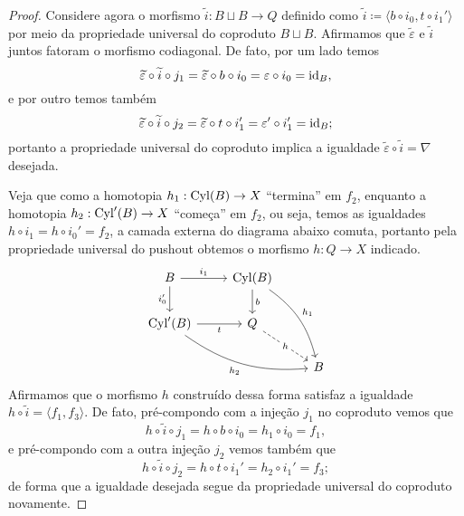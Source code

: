 \begin{proof}
  Considere agora o morfismo $\widetilde{i}: B \sqcup B \to Q$ definido como $\widetilde{i} \coloneqq \langle b \circ i_{0}, t \circ i_{1}' \rangle$ por meio da propriedade universal do coproduto $B \sqcup B$.
  Afirmamos que $\widetilde{\varepsilon}$ e $\widetilde{i}$ juntos fatoram o morfismo codiagonal.
  De fato, por um lado temos
  \begin{displaymath}
    \widetilde{\varepsilon} \circ \widetilde{i} \circ j_{1}
    = \widetilde{\varepsilon} \circ b \circ i_{0}
    = \varepsilon \circ i_{0}
    = \mathrm{id}_{B},
  \end{displaymath}
  e por outro temos também
  \begin{displaymath}
    \widetilde{\varepsilon} \circ \widetilde{i} \circ j_{2}
    = \widetilde{\varepsilon} \circ t \circ i_{1}'
    = \varepsilon' \circ i_{1}'
    = \mathrm{id}_{B};
  \end{displaymath}
  portanto a propriedade universal do coproduto implica a igualdade $\widetilde{\varepsilon} \circ \widetilde{i} = \nabla$ desejada.

  Veja que como a homotopia $h_{1}: \mathrm{Cyl}(B) \to X$ ``termina'' em $f_{2}$, enquanto a homotopia $h_{2}: \mathrm{Cyl}'(B) \to X$ ``começa'' em $f_{2}$, ou seja, temos as igualdades $h \circ i_{1} = h \circ i_{0}' = f_{2}$, a camada externa do diagrama abaixo comuta, portanto pela propriedade universal do pushout obtemos o morfismo $h: Q \to X$ indicado.
  \begin{displaymath}
     \begin{tikzcd}
      B
      \arrow[r, "i_{1}"]
      \arrow[d, "i_{0}'" swap]
      & \Cyl(B)
      \arrow[d, "b"]
      \arrow[rdd, bend left=20, "h_{1}"]
      \\ \Cyl'(B)
      \arrow[r, "t" swap]
      \arrow[rrd, bend right=20, "h_{2}" swap]
      & Q
      \arrow[rd, dashed, "h" description]
      \\ & & B
    \end{tikzcd}
  \end{displaymath}
  Afirmamos que o morfismo $h$ construído dessa forma satisfaz a igualdade $h \circ \widetilde{i} = \langle f_{1},f_{3} \rangle$.
  De fato, pré-compondo com a injeção $j_{1}$ no coproduto vemos que
  \begin{displaymath}
    h \circ \widetilde{i} \circ j_{1} = h \circ b \circ i_{0} = h_{1} \circ i_{0} = f_{1},
  \end{displaymath}
  e pré-compondo com a outra injeção $j_{2}$ vemos também que
  \begin{displaymath}
    h \circ \widetilde{i} \circ j_{2} = h \circ t \circ i_{1}' = h_{2} \circ i_{1}' = f_{3};
  \end{displaymath}
  de forma que a igualdade desejada segue da propriedade universal do coproduto novamente.


\end{proof}
